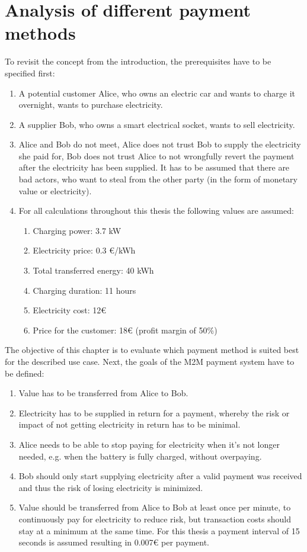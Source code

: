 \section{Analysis of different payment methods}

To revisit the concept from the introduction, the prerequisites have to be specified first:

\begin{enumerate}
    \item A potential customer Alice, who owns an electric car and wants to charge it overnight, wants to purchase electricity.
    \item A supplier Bob, who owns a smart electrical socket, wants to sell electricity.
    \item Alice and Bob do not meet, Alice does not trust Bob to supply the electricity she paid for, Bob does not trust Alice to not wrongfully revert the payment after the electricity has been supplied. It has to be assumed that there are bad actors, who want to steal from the other party (in the form of monetary value or electricity).
    \item For all calculations throughout this thesis the following values are assumed:
    \begin{enumerate}
        \item Charging power: 3.7 kW
        \item Electricity price: 0.3 \euro/kWh
        \item Total transferred energy: 40 kWh
        \item Charging duration: 11 hours
        \item Electricity cost: 12\euro
        \item Price for the customer: 18\euro{} (profit margin of 50\%)
    \end{enumerate}
\end{enumerate}

The objective of this chapter is to evaluate which payment method is suited best for the described use case. Next, the goals of the M2M payment system have to be defined:

\begin{enumerate}
    \item Value has to be transferred from Alice to Bob.
    \item Electricity has to be supplied in return for a payment, whereby the risk or impact of not getting electricity in return has to be minimal.
    \item Alice needs to be able to stop paying for electricity when it’s not longer needed, e.g. when the battery is fully charged, without overpaying.
    \item Bob should only start supplying electricity after a valid payment was received and thus the risk of losing electricity is minimized.
    \item Value should be transferred from Alice to Bob at least once per minute, to continuously pay for electricity to reduce risk, but transaction costs should stay at a minimum at the same time. For this thesis a payment interval of 15 seconds is assumed resulting in 0.007\euro{} per payment.
\end{enumerate}

